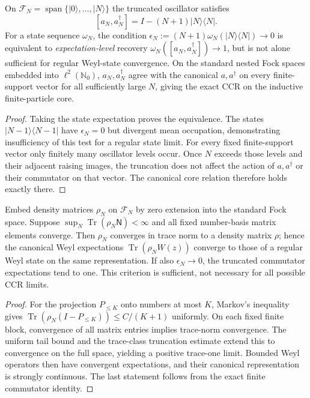 \documentclass[12pt,a4paper]{article}
\begin{document}
\begin{theorem}
\label{p12:thm:v350-ccr-expectation-vs-core}
On $\mathcal F_N=\operatorname{span}\{|0\rangle,\ldots,|N\rangle\}$
the truncated oscillator satisfies
\[
 [a_N,a_N^\dagger]
   =I-(N+1)|N\rangle\langle N|.
\]
For a state sequence $\omega_N$, the condition
$\epsilon_N:=(N+1)\omega_N(|N\rangle\langle N|)\to0$
is equivalent to \emph{expectation-level} recovery
$\omega_N([a_N,a_N^\dagger])\to1$, but is not alone
sufficient for regular Weyl-state convergence.
On the standard nested Fock spaces embedded into
$\ell^2(\mathbb N_0)$, $a_N,a_N^\dagger$ agree with the
canonical $a,a^\dagger$ on every finite-support vector
for all sufficiently large $N$, giving the exact CCR on the
inductive finite-particle core.
\end{theorem}
\begin{proof}
Taking the state expectation proves the equivalence.
The states $|N-1\rangle\langle N-1|$ have $\epsilon_N=0$
but divergent mean occupation, demonstrating insufficiency
of this test for a regular state limit. For every fixed
finite-support vector only finitely many oscillator levels
occur. Once $N$ exceeds those levels and their adjacent
raising images, the truncation does not affect the action
of $a,a^\dagger$ or their commutator on that vector.
The canonical core relation therefore holds exactly there.
\end{proof}

\begin{proposition}
\label{p12:prop:v350-ccr-state-tightness}
Embed density matrices $\rho_N$ on $\mathcal F_N$ by zero
extension into the standard Fock space. Suppose
$\sup_N\operatorname{Tr}(\rho_N\mathsf N)<\infty$ and
all fixed number-basis matrix elements converge.
Then $\rho_N$ converges in trace norm to a density matrix
$\rho$; hence the canonical Weyl expectations
$\operatorname{Tr}(\rho_N W(z))$ converge to those of a
regular Weyl state on the same representation.
If also $\epsilon_N\to0$, the truncated commutator
expectations tend to one. This criterion is sufficient,
not necessary for all possible CCR limits.
\end{proposition}
\begin{proof}
For the projection $P_{\le K}$ onto numbers at most $K$,
Markov's inequality gives
$\operatorname{Tr}(\rho_N(I-P_{\le K}))\le C/(K+1)$
uniformly. On each fixed finite block, convergence of all
matrix entries implies trace-norm convergence. The uniform
tail bound and the trace-class truncation estimate extend
this to convergence on the full space, yielding a positive
trace-one limit. Bounded Weyl operators then have convergent
expectations, and their canonical representation is strongly
continuous. The last statement follows from the exact finite
commutator identity.
\end{proof}
\end{document}
